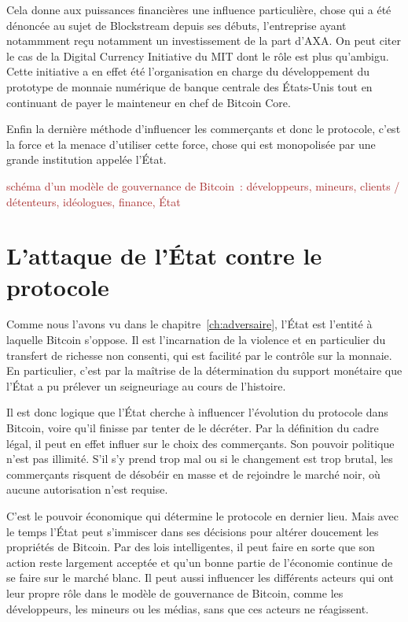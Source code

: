 %
Cela donne aux puissances financières une influence particulière, chose qui a été dénoncée au sujet de Blockstream depuis ses débuts, l'entreprise ayant notammment reçu notamment un investissement de la part d'AXA. On peut citer le cas de la Digital Currency Initiative du MIT dont le rôle est plus qu'ambigu. Cette initiative a en effet été l'organisation en charge du développement du prototype de monnaie numérique de banque centrale des États-Unis tout en continuant de payer le mainteneur en chef de Bitcoin Core.


Enfin la dernière méthode d'influencer les commerçants et donc le protocole, c'est la force et la menace d'utiliser cette force, chose qui est monopolisée par une grande institution appelée l'État.

\textcolor{brown}{schéma d'un modèle de gouvernance de Bitcoin~: développeurs, mineurs, clients / détenteurs, idéologues, finance, État}

\section*{L'attaque de l'État contre le protocole} %

Comme nous l'avons vu dans le chapitre~\ref{ch:adversaire}, l'État est l'entité à laquelle Bitcoin s'oppose. Il est l'incarnation de la violence et en particulier du transfert de richesse non consenti, qui est facilité par le contrôle sur la monnaie. En particulier, c'est par la maîtrise de la détermination du support monétaire que l'État a pu prélever un seigneuriage au cours de l'histoire.

Il est donc logique que l'État cherche à influencer l'évolution du protocole dans Bitcoin, voire qu'il finisse par tenter de le décréter. Par la définition du cadre légal, il peut en effet influer sur le choix des commerçants. Son pouvoir politique n'est pas illimité. S'il s'y prend trop mal ou si le changement est trop brutal, les commerçants risquent de désobéir en masse et de rejoindre le marché noir, où aucune autorisation n'est requise.

C'est le pouvoir économique qui détermine le protocole en dernier lieu. Mais avec le temps l'État peut s'immiscer dans ses décisions pour altérer doucement les propriétés de Bitcoin. Par des lois intelligentes, il peut faire en sorte que son action reste largement acceptée et qu'un bonne partie de l'économie continue de se faire sur le marché blanc. Il peut aussi influencer les différents acteurs qui ont leur propre rôle dans le modèle de gouvernance de Bitcoin, comme les développeurs, les mineurs ou les médias, sans que ces acteurs ne réagissent.

